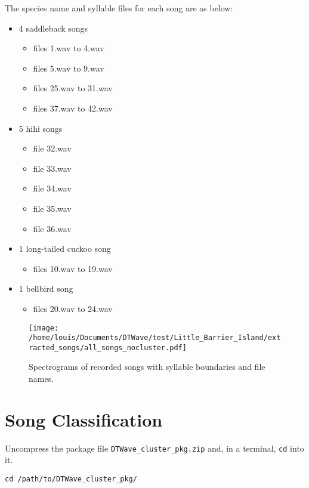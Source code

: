 \documentclass[a4paper]{article}
\begin{document}
The species name and syllable files for each song are as below:
\begin{itemize}
\item 4 saddleback songs
  \begin{itemize}
  \item files 1.wav to 4.wav
  \item files 5.wav to 9.wav
  \item files 25.wav to 31.wav
  \item files 37.wav to 42.wav
  \end{itemize}
\item 5 hihi songs
  \begin{itemize}
  \item file 32.wav
  \item file 33.wav
  \item file 34.wav
  \item file 35.wav
  \item file 36.wav
  \end{itemize}
\item 1 long-tailed cuckoo song
  \begin{itemize}
  \item files 10.wav to 19.wav
  \end{itemize}
\item 1 bellbird song
  \begin{itemize}
  \item files 20.wav to 24.wav
  \end{itemize}
\end{itemize}


\begin{figure}[h!]
\begin{center}
\texttt{[image: /home/louis/Documents/DTWave/test/Little\_Barrier\_Island/extracted\_songs/all\_songs\_nocluster.pdf]}
\vspace{1cm}
\caption{Spectrograms of recorded songs with syllable boundaries and file names.}
\end{center}
\label{fig:songs}
\end{figure}

\clearpage
\section{Song Classification}
Uncompress the package file \texttt{DTWave\_cluster\_pkg.zip} and, in a terminal, \texttt{cd} into it.
\begin{verbatim}
cd /path/to/DTWave_cluster_pkg/
\end{verbatim}
\end{document}

